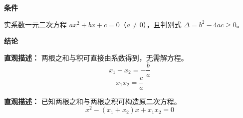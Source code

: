 \begin{statementbox}
	\textbf{\textcolor{CStatement}{条件}}
	\begin{description}[style=nextline, leftmargin=2.8em, labelsep=0.5em, itemsep=0.35em]
		\item[\textbf{\textcolor{CStatement}{条件 1（使用前提）：}}]
			实系数一元二次方程 $ax^2+bx+c=0$（$a\neq0$），且判别式 $\Delta=b^2-4ac\geq0$。
	\end{description}
	\textbf{\textcolor{CStatement}{结论}}
	\begin{description}[style=nextline, leftmargin=2.8em, labelsep=0.5em, itemsep=0.45em]
		\item[\textbf{\textcolor{CStatement}{结论一（根与系数）：}}]
			\textbf{\textcolor{CStatement}{直观描述：}}
			两根之和与积可直接由系数得到，无需解方程。
			\[
				x_1+x_2=-\frac{b}{a}
			\]
			\[
				x_1x_2=\frac{c}{a}
			\]
		\item[\textbf{\textcolor{CStatement}{推广结论（逆用构造）：}}]
			\textbf{\textcolor{CStatement}{直观描述：}}
			已知两根之和与两根之积可构造原二次方程。
			\[
				x^2-(x_1+x_2)x+x_1x_2=0
			\]
	\end{description}

\end{statementbox}
